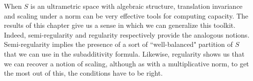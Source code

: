 When $S$ is an ultrametric space with algebraic structure, translation invariance and scaling under a norm can be very effective tools for computing capacity. The results of this chapter give us  a sense in which we can generalize this toolkit. Indeed, semi-regularity and regularity respectively provide the analogous notions. Semi-regularity implies the presence of a sort of ``well-balanced" partition of $S$ that we can use in the subadditivity formula. Likewise, regularity shows us that we can recover a notion of scaling, although as with a multiplicative norm, to get the most out of this, the conditions have to be right. 













